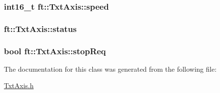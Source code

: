 \subsubsection[{\texorpdfstring{speed}{speed}}]{\setlength{\rightskip}{0pt plus 5cm}int16\+\_\+t ft\+::\+Txt\+Axis\+::speed\hspace{0.3cm}{\ttfamily [protected]}}\hypertarget{classft_1_1_txt_axis_a3103b6972533eaac191a0a9e5c2e0564}{}\label{classft_1_1_txt_axis_a3103b6972533eaac191a0a9e5c2e0564}
\subsubsection[{\texorpdfstring{status}{status}}]{ ft\+::\+Txt\+Axis\+::status\hspace{0.3cm}{\ttfamily [protected]}}\hypertarget{classft_1_1_txt_axis_a2f74c132b00116f57ceb65cab7a525ee}{}\label{classft_1_1_txt_axis_a2f74c132b00116f57ceb65cab7a525ee}
\subsubsection[{\texorpdfstring{stop\+Req}{stopReq}}]{\setlength{\rightskip}{0pt plus 5cm}bool ft\+::\+Txt\+Axis\+::stop\+Req\hspace{0.3cm}{\ttfamily [protected]}}\hypertarget{classft_1_1_txt_axis_a27e59819797bfc1885d2fc4d3ebbe209}{}\label{classft_1_1_txt_axis_a27e59819797bfc1885d2fc4d3ebbe209}


The documentation for this class was generated from the following file\+:\begin{DoxyCompactItemize}
\item 
\hyperlink{_txt_axis_8h}{Txt\+Axis.\+h}\end{DoxyCompactItemize}
